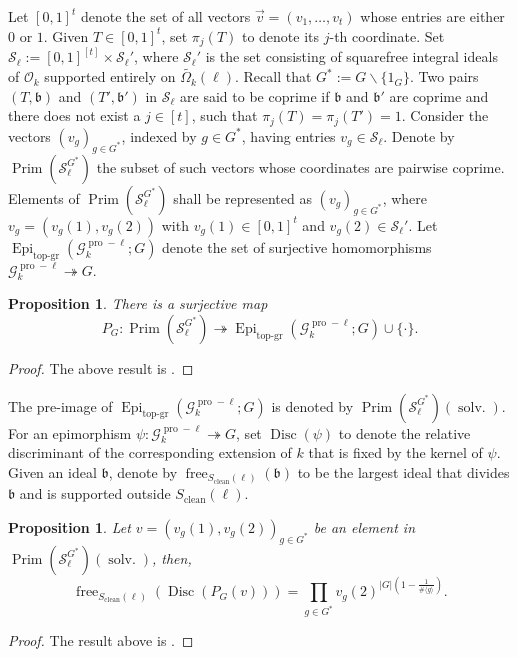 \documentclass[11pt]{amsart}
\newtheorem{proposition}[theorem]{Proposition}
\newcommand{\op}[1]{\operatorname{#1}}
\numberwithin{equation}{section}
\begin{document}
\par Let $[0,1]^t$ denote the set of all vectors $\vec{v}=(v_1, \dots, v_t)$ whose entries are either $0$ or $1$. Given $T\in [0, 1]^t$, set $\pi_j(T)$ to denote its $j$-th coordinate. Set $\mathcal{S}_\ell:=[0,1]^{[t]}\times \mathcal{S}_\ell'$, where $\mathcal{S}_\ell'$ is the set consisting of squarefree integral ideals of $\mathcal{O}_k$ supported entirely on $\widetilde{\Omega_k}(\ell)$. Recall that $G^\ast:=G\backslash \{1_G\}$. Two pairs $(T, \mathfrak{b})$ and $(T', \mathfrak{b}')$ in $\mathcal{S}_\ell$ are said to be coprime if $\mathfrak{b}$ and $\mathfrak{b}'$ are coprime and there does not exist a $j\in [t]$, such that $\pi_j(T)=\pi_j(T')=1$. Consider the vectors $(v_g)_{g\in G^\ast}$, indexed by $g\in G^\ast$, having entries $v_g\in \mathcal{S}_\ell$. Denote by $\op{Prim}\left(\mathcal{S}_\ell^{G^\ast}\right)$ the subset of such vectors whose coordinates are pairwise coprime. Elements of $\op{Prim}\left(\mathcal{S}_\ell^{G^\ast}\right)$ shall be represented as $(v_g)_{g\in G^\ast}$, where $v_g=(v_g{(1)}, v_g{(2)})$ with $v_g{(1)}
\in [0,1]^t$ and $v_g{(2)}\in \mathcal{S}_\ell'$. Let $\op{Epi}_{\op{top-gr}}\left(\mathcal{G}_k^{\op{pro}-\ell}; G\right)$ denote the set of surjective homomorphisms $\mathcal{G}_k^{\op{pro}-\ell}\twoheadrightarrow G$.
\begin{proposition}
    There is a surjective map 
    \[P_G: \op{Prim}\left(\mathcal{S}_\ell^{G^\ast}\right)\twoheadrightarrow \op{Epi}_{\op{top-gr}}\left(\mathcal{G}_k^{\op{pro}-\ell}; G\right)\cup \{\cdot\}.\]
\end{proposition}
\begin{proof}
    The above result is \cite[Proposition 2.8]{koymanspagano2023}.
\end{proof}
The pre-image of $\op{Epi}_{\op{top-gr}}\left(\mathcal{G}_k^{\op{pro}-\ell}; G\right)$ is denoted by $ \op{Prim}\left(\mathcal{S}_\ell^{G^\ast}\right)(\op{solv.})$. For an epimorphism $\psi: \mathcal{G}_k^{\op{pro}-\ell}\twoheadrightarrow G$, set $\op{Disc}(\psi)$ to denote the relative discriminant of the corresponding extension of $k$ that is fixed by the kernel of $\psi$. Given an ideal $\mathfrak{b}$, denote by $\op{free}_{S_{\op{clean}}(\ell)}(\mathfrak{b})$ to be the largest ideal that divides $\mathfrak{b}$ and is supported outside $S_{\op{clean}}(\ell)$. 

\begin{proposition}\label{S free discriminant 1}
    Let $v=(v_g(1) , v_g(2))_{g\in G^\ast}$ be an element in $ \op{Prim}\left(\mathcal{S}_\ell^{G^\ast}\right)(\op{solv.})$, then, 
    \[\op{free}_{S_{\op{clean}}(\ell)}\left(\op{Disc}(P_G(v))\right)=\prod_{g\in G^\ast} v_g(2)^{|G| \left(1-\frac{1}{\# \langle g\rangle}\right)}.\]
\end{proposition}
\begin{proof}
The result above is \cite[Proposition 2.10]{koymanspagano2023}.
\end{proof}
\end{document}
